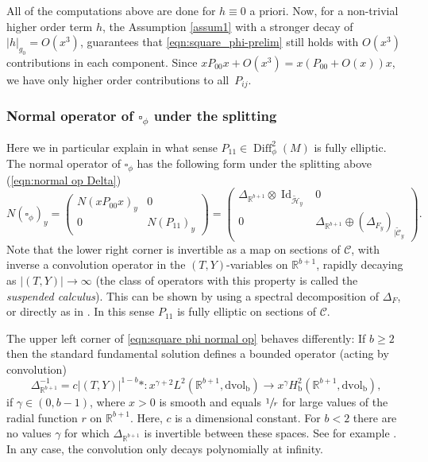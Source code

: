 \documentclass[JEP,XML,SOM,Unicode,NoFloatCountersInSection,published]{cedram}
\theoremstyle{plain}
\theoremstyle{definition}
\newcommand{\R}{{\mathbb{R}}}
\newcommand{\bb}{{\mathrm{b}}}
\newcommand{\dvol}{\mathrm{dvol}}
\DeclareMathOperator{\Diff}{Diff}
\DeclareMathOperator{\Id}{Id}
\begin{document}
All of the computations above are done for $h\equiv 0$ a priori. Now, for
a non-trivial higher order term $h$, the Assumption \ref{assum1}
with a stronger decay of $|h|_{g_0} = O(x^3)$, guarantees that
\eqref{eqn:square_phi-prelim} still holds with $O(x^3)$ contributions in each
component. Since \eg $xP_{00}x + O(x^3) = x(P_{00}+O(x))x$,
we have only higher order contributions to all~$P_{ij}$.

\subsubsection{Normal operator of $\square_\phi$ under the splitting}
Here we in particular explain in what sense $P_{11}\in \Diff^2_\phi(M)$ is fully
elliptic. The normal operator of $\square_\phi$ has the following form
under the splitting above (\cf \eqref{eqn:normal op Delta})
\begin{equation}
\label{eqn:square phi normal op}
N(\square_\phi)_y =
\begin{pmatrix}
N(xP_{00}x)_y & 0 \\
0 & N(P_{11})_y
\end{pmatrix}
=
\begin{pmatrix}
\Delta_{\R^{b+1}} \otimes \Id_{\widetilde{\mathscr{H}}_y} & 0 \\
0 & \Delta_{\R^{b+1}} \oplus (\Delta_{F_y})_{|\widetilde{\mathscr{C}}_y}
\end{pmatrix}.
\end{equation}
Note that the lower right corner is invertible as a map on sections of $\mathscr{C}$, with inverse a convolution operator in the $(T,Y)$-variables on $\R^{b+1}$, rapidly decaying as \hbox{$|(T,Y)|\!\to\!\infty$} (the class of operators with this property is called the \textit{suspended calculus}). This can be shown by using a spectral decomposition of $\Delta_F$, or directly as in \cite[Prop.\,2.3]{grieser-para}.
In this sense $P_{11}$ is fully elliptic on sections of $\mathscr{C}$.

The upper left corner of \eqref{eqn:square phi normal op} behaves differently:
If $b\geq2$ then the standard fundamental solution defines a bounded operator
(acting by convolution)
\begin{equation}
\label{eqn:inverse Delta}
\Delta_{\R^{b+1}}^{-1} = c|(T,Y)|^{1-b}* : x^{\gamma+2}
L^2(\R^{b+1},\dvol_\bb) \to x^{\gamma} H^2_\bb(\R^{b+1},\dvol_\bb),
\end{equation}
if $\gamma\in(0,b-1)$, where $x>0$ is smooth and equals $\sfrac1r$ for large values of the
radial function $r$ on $\R^{b+1}$. Here, $c$ is a dimensional constant. For $b<2$ there are no values $\gamma$ for
which $\Delta_{\R^{b+1}}$ is invertible between these spaces. See for example
\cite[Prop.\,A.2]{AlbRocShe:RHKTDFC}.
In any case, the convolution only decays polynomially at infinity.
\end{document}
